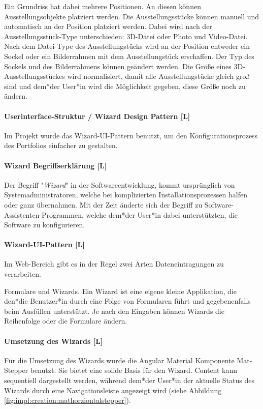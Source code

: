 Ein Grundriss hat dabei mehrere Positionen. An diesen können Ausstellungsobjekte platziert werden. Die Ausstellungsstücke können manuell und automatisch an der Position platziert werden.
Dabei wird nach der Ausstellungsstück-Type unterschieden: 3D-Datei oder Photo und Video-Datei. Nach dem Datei-Type des Ausstellungstücks wird an der Position entweder ein Sockel oder ein Bilderrahmen mit dem Ausstellungstück erschaffen. Der Typ des Sockels und des Bilderrahmens können geändert werden.
Die Größe eines 3D-Ausstellungsstückes wird normalisiert, damit alle Ausstellungstücke gleich groß sind und dem*der User*in wird die Möglichkeit gegeben, diese Größe noch zu ändern.

\paragraph{Userinterface-Struktur / Wizard Design Pattern [L]}
\label{sec::contentcreation::wizard}
Im Projekt wurde das Wizard-UI-Pattern benutzt, um den Konfigurationsprozess des Portfolios einfacher zu gestalten.

\paragraph*{Wizard Begriffserklärung [L]}
Der Begriff "\emph{Wizard}" in der Softwareentwicklung, kommt ursprünglich von Systemadministratoren, welche bei komplizierten Installationsprozessen halfen oder ganz übernahmen. Mit der Zeit änderte sich der Begriff zu Software-Assistenten-Programmen, welche dem*der User*in dabei unterstützten, die Software zu konfigurieren. \cite[Ursprung des Begriffs Wizard]{OrigionOfWizards}

\paragraph{Wizard-UI-Pattern [L]}
Im Web-Bereich gibt es in der Regel zwei Arten Dateneintragungen zu verarbeiten.

Formulare und Wizards. Ein Wizard ist eine eigene kleine Applikation, die den*die Benutzer*in durch eine Folge von Formularen führt und gegebenenfalls beim Ausfüllen unterstützt. Je nach den Eingaben können Wizards die Reihenfolge oder die Formulare ändern.\cite[Wizards: Definition and Design Recommendations]{WizradsDefinitionAndRecommandation}

\paragraph{Umsetzung des Wizards [L]}
Für die Umsetzung des Wizards wurde die Angular Material Komponente Mat-Stepper benutzt. Sie bietet eine solide Basis für den Wizard. Content kann sequentiell dargestellt werden, während dem*der User*in der aktuelle Status des Wizards durch eine Navigationsleiste angezeigt wird (siehe Abbildung \ref{fig:impl:creation:mathorziontalstepper}). \cite{amStepper}

